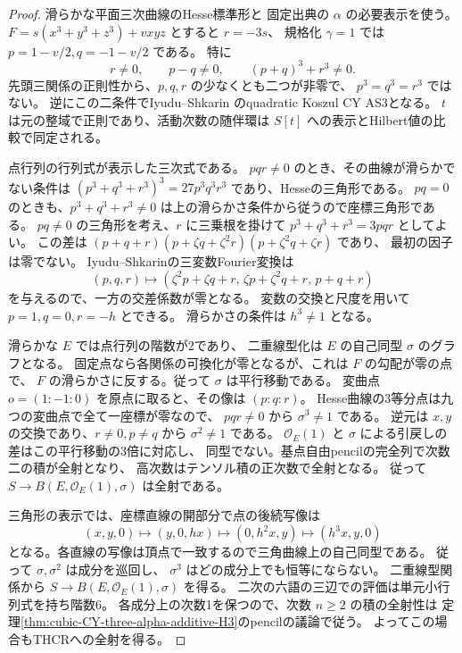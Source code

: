 \begin{proof}
滑らかな平面三次曲線のHesse標準形\cite{ADHesse}と
固定出典\cite{AS4CYpinned}の $\alpha$ の必要表示を使う。
$F=s(x^3+y^3+z^3)+vxyz$ とすると $r=-3s$、
規格化 $\gamma=1$ では $p=1-v/2,q=-1-v/2$ である。
特に
\[
 r\ne0,\qquad p-q\ne0,\qquad (p+q)^3+r^3\ne0.
\]
先頭三関係の正則性から、$p,q,r$ の少なくとも二つが非零で、
$p^3=q^3=r^3$ ではない。
逆にこの二条件でIyudu--Shkarin
\cite[定理1.1および系6.1]{ISSklyanin}のquadratic Koszul CY AS3となる。
$t$ は元の整域で正則であり、活動次数の随伴環は
$S[t]$ への表示とHilbert値の比較で同定される。

点行列の行列式が表示した三次式である。
$pqr\ne0$ のとき、その曲線が滑らかでない条件は
$(p^3+q^3+r^3)^3=27p^3q^3r^3$ であり、Hesseの三角形である。
$pq=0$ のときも、$p^3+q^3+r^3\ne0$ は上の滑らかさ条件から従うので座標三角形である。
$pq\ne0$ の三角形を考え、$r$ に三乗根を掛けて
$p^3+q^3+r^3=3pqr$ としてよい。
この差は
$(p+q+r)(p+\zeta q+\zeta^2r)(p+\zeta^2 q+\zeta r)$ であり、
最初の因子は零でない。
Iyudu--Shkarinの三変数Fourier変換は
\[
 (p,q,r)\longmapsto(\zeta^2p+\zeta q+r,\,
                     \zeta p+\zeta^2q+r,\,p+q+r)
\]
を与えるので、一方の交差係数が零となる。
変数の交換と尺度を用いて $p=1,q=0,r=-h$ とできる。
滑らかさの条件は $h^3\ne1$ となる。

滑らかな $E$ では点行列の階数が2であり、
二重線型化は $E$ の自己同型 $\sigma$ のグラフとなる。
固定点なら各関係の可換化が零となるが、これは $F$ の勾配が零の点で、
$F$ の滑らかさに反する。従って $\sigma$ は平行移動である。
変曲点 $o=(1:-1:0)$ を原点に取ると、その像は $(p:q:r)$。
Hesse曲線の3等分点は九つの変曲点で全て一座標が零なので、
$pqr\ne0$ から $\sigma^3\ne1$ である。
逆元は $x,y$ の交換であり、$r\ne0,p\ne q$ から $\sigma^2\ne1$ である。
$\mathcal O_E(1)$ と $\sigma$ による引戻しの差はこの平行移動の3倍に対応し、
同型でない。基点自由pencilの完全列で次数二の積が全射となり、
高次数はテンソル積の正次数で全射となる。
従って $S\to B(E,\mathcal O_E(1),\sigma)$ は全射である。

三角形の表示では、座標直線の開部分で点の後続写像は
\[
 (x,y,0)\longmapsto (y,0,hx)
 \longmapsto (0,h^2 x,y)
 \longmapsto (h^3x,y,0)
\]
となる。各直線の写像は頂点で一致するので三角曲線上の自己同型である。
従って $\sigma,\sigma^2$ は成分を巡回し、
$\sigma^3$ はどの成分上でも恒等にならない。
二重線型関係から $S\to B(E,\mathcal O_E(1),\sigma)$ を得る。
二次の六語の三辺での評価は単元小行列式を持ち階数6。
各成分上の次数1を保つので、次数 $n\ge2$ の積の全射性は
定理\ref{thm:cubic-CY-three-alpha-additive-H3}のpencilの議論で従う。
よってこの場合もTHCRへの全射を得る。


\end{proof}
